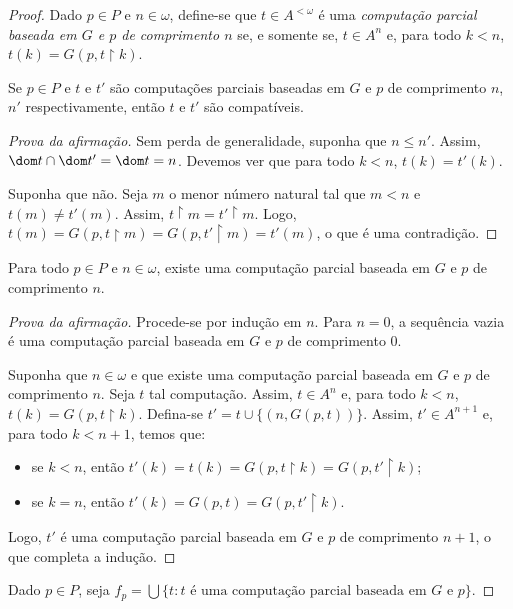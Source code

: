 \begin{proof}
    Dado $p \in P$ e $n \in \omega$, define-se que $t \in A^{<\omega}$ é uma \emph{computação parcial baseada em $G$ e $p$ de comprimento $n$} se, e somente se, $t\in A^n$ e, para todo $k<n$, $t(k)=G(p, t\restriction k)$.
    
    \begin{claim}
        Se $p \in P$ e $t$ e $t'$ são computações parciais baseadas em $G$ e $p$ de comprimento $n$, $n'$ respectivamente, então $t$ e $t'$ são compatíveis.
    \end{claim}
    \begin{proof}[Prova da afirmação]
        Sem perda de generalidade, suponha que $n\leq n'$.
        Assim, $\dom t\cap \dom t'=\dom t=n$.
        Devemos ver que para todo $k<n$, $t(k)=t'(k)$.

        Suponha que não.
        Seja $m$ o menor número natural tal que $m<n$ e $t(m)\neq t'(m)$.
        Assim, $t\restriction m=t'\restriction m$.
        Logo, $t(m)=G(p, t\restriction m)=G(p, t'\restriction m)=t'(m)$, o que é uma contradição.
    \end{proof}
    \begin{claim}
        Para todo $p \in  P$ e $n \in \omega$, existe uma computação parcial baseada em $G$ e $p$ de comprimento $n$.
    \end{claim}
    \begin{proof}[Prova da afirmação]
        Procede-se por indução em $n$.
        Para $n=0$, a sequência vazia é uma computação parcial baseada em $G$ e $p$ de comprimento $0$.

        Suponha que $n\in \omega$ e que existe uma computação parcial baseada em $G$ e $p$ de comprimento $n$.
        Seja $t$ tal computação.
        Assim, $t\in A^n$ e, para todo $k<n$, $t(k)=G(p, t\restriction k)$.
        Defina-se $t'=t\cup \{(n, G(p, t))\}$.
        Assim, $t'\in A^{n+1}$ e, para todo $k<n+1$, temos que:
        \begin{itemize}
            \item se $k<n$, então $t'(k)=t(k)=G(p, t\restriction k)=G(p, t'\restriction k)$;
            \item se $k=n$, então $t'(k)=G(p, t)=G(p, t'\restriction k)$.
        \end{itemize}
        Logo, $t'$ é uma computação parcial baseada em $G$ e $p$ de comprimento $n+1$, o que completa a indução.
    \end{proof}

    Dado $p \in P$, seja $f_p=\bigcup\{t: t \text{ é uma computação parcial baseada em } G \text{ e } p\}$.


\end{proof}
